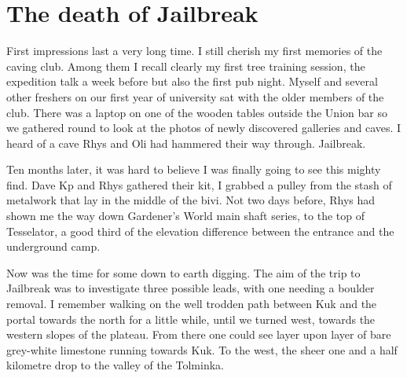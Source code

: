 \section{The death of Jailbreak}
	\begin{marginfigure}
	\end{marginfigure}


	First impressions last a very long time. I still cherish my first memories of the caving club. Among them I recall clearly my first tree training session, the expedition talk a week before but also the first pub night. Myself and several other freshers on our first year of university sat with the older members of the club. There was a laptop on one of the wooden tables outside the Union bar so we gathered round to look at the photos of newly discovered galleries and caves. I heard of a cave Rhys and Oli had hammered their way through. Jailbreak. 

	Ten months later, it was hard to believe I was finally going to see this mighty find. Dave Kp and Rhys gathered their kit, I grabbed a pulley from the stash of metalwork that lay in the middle of the bivi. Not two days before, Rhys had shown me the way down Gardener's World main shaft series, to the top of Tesselator, a good third of the elevation difference between the entrance and the underground camp. 

	Now was the time for some down to earth digging. The aim of the trip to Jailbreak was to investigate three possible leads, with one needing a boulder removal. I remember walking on the well trodden path between Kuk and the portal towards the north for a little while, until we turned west, towards the western slopes of the plateau. From there one could see layer upon layer of bare grey-white limestone running towards Kuk. To the west, the sheer one and a half kilometre drop to the valley of the Tolminka. 

